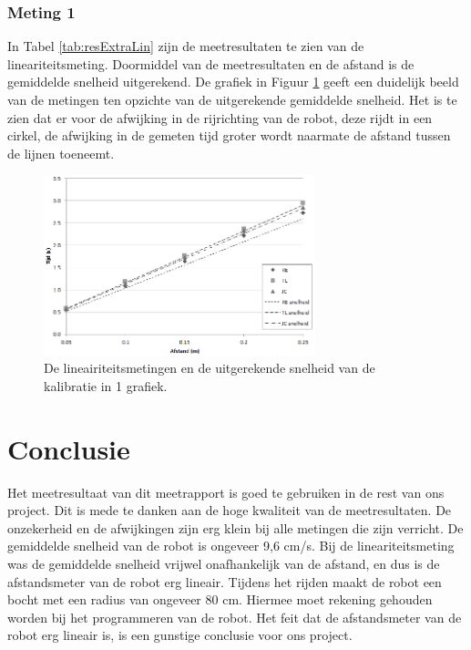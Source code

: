 \documentclass{report}
\begin{document}
\subsection*{Meting 1}
In Tabel \ref{tab:resExtraLin} zijn de meetresultaten te zien van de lineariteitsmeting. Doormiddel van de meetresultaten en de afstand is de gemiddelde snelheid uitgerekend. De grafiek in Figuur \ref{fig:linGraph} geeft een duidelijk beeld van de metingen ten opzichte van de uitgerekende gemiddelde snelheid. Het is te zien dat er voor de afwijking in de rijrichting van de robot, deze rijdt in een cirkel, de afwijking in de gemeten tijd groter wordt naarmate de afstand tussen de lijnen toeneemt.

\begin{figure}[H]
	\centering
	\includegraphics[width=0.7\textwidth]{lineairiteit}
	\caption{De lineairiteitsmetingen en de uitgerekende snelheid van de kalibratie in 1 grafiek.}
	\label{fig:linGraph}
\end{figure}

\newpage
\chapter{Conclusie}
Het meetresultaat van dit meetrapport is goed te gebruiken in de rest van ons project. Dit is mede te danken aan de hoge kwaliteit van de meetresultaten. De onzekerheid en de afwijkingen zijn erg klein bij alle metingen die zijn verricht. De gemiddelde snelheid van de robot is ongeveer 9,6 cm/s. Bij de lineariteitsmeting was de gemiddelde snelheid vrijwel onafhankelijk van de afstand, en dus is de afstandsmeter van de robot erg lineair. Tijdens het rijden maakt de robot een bocht met een radius van ongeveer 80 cm. Hiermee moet rekening gehouden worden bij het programmeren van de robot. Het feit dat de afstandsmeter van de robot erg lineair is, is een gunstige conclusie voor ons project.
\end{document}
